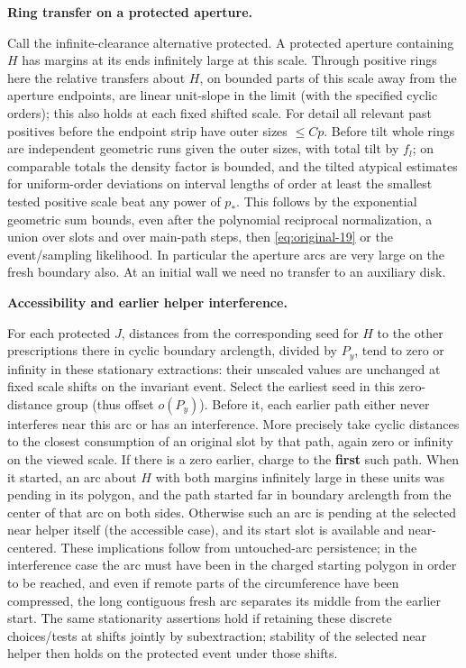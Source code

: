 \smallskip
\noindent\textbf{Ring transfer on a protected aperture.}\quad

Call the infinite-clearance alternative protected. A protected aperture containing \(H\)
has margins at its ends infinitely large at this scale. Through positive rings here the
relative transfers about \(H\), on bounded parts of this scale away from the aperture
endpoints, are linear unit-slope in the limit (with the specified cyclic orders); this
also holds at each fixed shifted scale. For detail all relevant past positives before the
endpoint strip have outer sizes \(\le C p\). Before tilt whole rings are independent
geometric runs given the outer sizes, with total tilt by \(f_l\); on comparable totals the
density factor is bounded, and the tilted atypical estimates for uniform-order deviations
on interval lengths of order at least the smallest tested positive scale beat any power of
\(p_*\). This follows by the exponential geometric sum bounds, even after the polynomial
reciprocal normalization, a union over slots and over main-path steps, then
\eqref{eq:original-19} or the event/sampling likelihood. In particular the aperture arcs
are very large on the fresh boundary also. At an initial wall we need no transfer to an
auxiliary disk.

\smallskip
\noindent\textbf{Accessibility and earlier helper interference.}\quad

For each protected \(J\), distances from the corresponding seed for \(H\) to the other
prescriptions there in cyclic boundary arclength, divided by \(P_y\), tend to zero or
infinity in these stationary extractions: their unscaled values are unchanged at fixed
scale shifts on the invariant event. Select the earliest seed in this zero-distance group
(thus offset \(o(P_y)\)). Before it, each earlier path either never interferes near this
arc or has an interference. More precisely take cyclic distances to the closest
consumption of an original slot by that path, again zero or infinity on the viewed scale.
If there is a zero earlier, charge to the \textbf{first} such path. When it started, an
arc about \(H\) with both margins infinitely large in these units was pending in its
polygon, and the path started far in boundary arclength from the center of that arc on
both sides. Otherwise such an arc is pending at the selected near helper itself (the
accessible case), and its start slot is available and near-centered. These implications
follow from untouched-arc persistence; in the interference case the arc must have been in
the charged starting polygon in order to be reached, and even if remote parts of the
circumference have been compressed, the long contiguous fresh arc separates its middle
from the earlier start. The same stationarity assertions hold if retaining these discrete
choices/tests at shifts jointly by subextraction; stability of the selected near helper
then holds on the protected event under those shifts.

